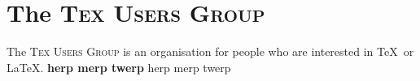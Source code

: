 \documentclass{article}
\newcommand{\TUG}{\textsc{Tex Users Group}\xspace}
\begin{document}
\section{The \TUG}
The \TUG is an organisation for people who are interested in \TeX\ or \LaTeX.
\textbf{herp merp twerp} herp merp twerp
\end{document}

